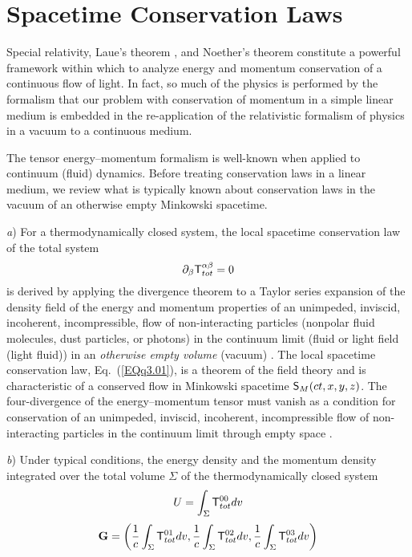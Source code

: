 \documentclass[twocolumn,amssymb,eqsecnum,aps,pra]{revtex4-2}
\begin{document}
\section{Spacetime Conservation Laws}
\par
Special relativity, Laue's theorem \cite{BIGiu,BIWang2}, and Noether's
theorem \cite{BINoether} constitute a powerful framework within which
 to analyze energy and momentum conservation of a continuous flow of
light.
In fact, so much of the physics is performed by the formalism that
our problem with conservation of momentum in a simple linear medium
is embedded in the re-application of the relativistic formalism of
physics in a vacuum to a continuous medium.
\par
The tensor energy--momentum formalism is well-known when applied to
continuum (fluid) dynamics.
Before treating conservation laws in a linear medium, we review what
is typically known about conservation laws in the vacuum
of an otherwise empty Minkowski spacetime.
\par
\textit{a}) For a thermodynamically closed system, the local spacetime
conservation law of the total system
\begin{equation}
\partial_{\beta}{\sf T}_{tot}^{\alpha\beta}=0
\label{EQq3.01}
\end{equation}
is derived by applying the divergence theorem to a Taylor series
expansion of the density field of the energy and momentum properties
of an unimpeded, inviscid, incoherent, incompressible, flow of
non-interacting particles (nonpolar fluid molecules, dust particles,
or photons) in the continuum limit (fluid or light field
(light fluid)) in an \textit{otherwise empty volume}
(vacuum) \cite{BIFox}.
The local spacetime conservation law, Eq.~(\ref{EQq3.01}), is a
theorem of the field theory and is characteristic of a 
conserved flow in Minkowski spacetime ${\sf S}_M(ct,x,y,z)$.
The four-divergence of the energy--momentum tensor must vanish
as a condition for conservation of an unimpeded, inviscid,
incoherent, incompressible flow of non-interacting particles in the
continuum limit through empty space \cite{BIFox,BIGold}.
\par
\textit{b}) Under typical conditions, the energy density and
the momentum density integrated over the total volume $\Sigma$ of the
thermodynamically closed system
\begin{equation}
U=\int_{\Sigma} {\sf T}_{tot}^{00} dv
\label{EQq3.02}
\end{equation}
\begin{equation}
{\bf G}=\left (\frac{1}{c} \int_{\Sigma}{\sf T}_{tot}^{01} dv,
\frac{1}{c}\int_{\Sigma}{\sf T}_{tot}^{02} dv,
\frac{1}{c}\int_{\Sigma}{\sf T}_{tot}^{03} dv \right )
\label{EQq3.03}
\end{equation}
\end{document}
